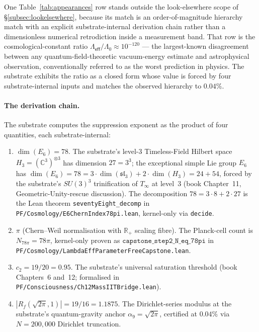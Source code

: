 \documentclass[11pt,a4paper]{amsart}
\theoremstyle{plain}
\theoremstyle{definition}
\begin{document}
One Table~\ref{tab:appearances} row stands outside the look-elsewhere scope of \S\ref{subsec:lookelsewhere}, because its match is an order-of-magnitude hierarchy match with an explicit substrate-internal derivation chain rather than a dimensionless numerical retrodiction inside a measurement band. That row is the cosmological-constant ratio $\Lambda_{\textsf{eff}}/\Lambda_0 \approx 10^{-120}$ --- the largest-known disagreement between any quantum-field-theoretic vacuum-energy estimate and astrophysical observation, conventionally referred to as the worst prediction in physics. The substrate exhibits the ratio as a closed form whose value is forced by four substrate-internal inputs and matches the observed hierarchy to $0.04\%$.

\paragraph{The derivation chain.} The substrate computes the suppression exponent as the product of four quantities, each substrate-internal:
\begin{enumerate}[label=\textup{(\arabic*)},itemsep=2pt]
\item $\dim(E_6) = 78$. The substrate's level-3 Timeless-Field Hilbert space $H_3 = (\mathbb{C}^3)^{\otimes 3}$ has dimension $27 = 3^3$; the exceptional simple Lie group $E_6$ has $\dim(E_6) = 78 = 3\cdot\dim(\mathfrak{sl}_3) + 2\cdot\dim(H_3) = 24 + 54$, forced by the substrate's $SU(3)^3$ trinification of $T_\infty$ at level~3 (book Chapter~11, Geometric-Unity-rescue discussion). The decomposition $78 = 3\cdot 8 + 2\cdot 27$ is the Lean theorem \texttt{seventyEight\_decomp} in \texttt{PF/Cosmology/E6ChernIndex78pi.lean}, kernel-only via \texttt{decide}.

\item $\pi$ (Chern--Weil normalisation with $\mathbb{R}_+$ scaling fibre). The Planck-cell count is $N_{78\pi} = 78\pi$, kernel-only proven as $\texttt{capstone\_step2\_N\_eq\_78pi}$ in \texttt{PF/Cosmology/Lambda\-Eff\-Para\-meter\-Free\-Capstone.lean}.

\item $c_2 = 19/20 = 0.95$. The substrate's universal saturation threshold (book Chapters~6 and~12; formalised in \texttt{PF/Consciousness/Ch12MassIITBridge.lean}).

\item $|R_f(\sqrt{2\pi}, 1)| = 19/16 = 1.1875$. The Dirichlet-series modulus at the substrate's quantum-gravity anchor $\alpha_9 = \sqrt{2\pi}$, certified at $0.04\%$ via $N = 200{,}000$ Dirichlet truncation.
\end{enumerate}
\end{document}

